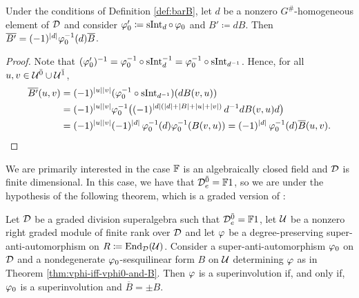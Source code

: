 \begin{lemma}\label{lemma:bar-dB}
    Under the conditions of Definition \ref{def:barB}, let $d$ be a nonzero $G^\#$-homogeneous element of $\mathcal{D}$ and consider $\varphi_0' \coloneqq \operatorname{sInt}_d\circ\, \varphi_0$ and $B' \coloneqq d B$. 
    Then $\overline {B'} = (-1)^{|d|} \varphi_0^{-1} (d) \overline B$.
\end{lemma}

\begin{proof}
    Note that $(\varphi_0')^{-1} = \varphi_0^{-1} \circ \operatorname{sInt}_{d}^{-1} = \varphi_0^{-1} \circ \operatorname{sInt}_{d^{-1}}$. 
    Hence, for all $u, v \in \mathcal U^{\bar0} \cup \mathcal U^{\bar1}$,
    \begin{align*}
        \overline {B'} (u,v) &= (-1)^{|u||v|} (\varphi_0^{-1} \circ \operatorname{sInt}_{d^{-1}})  (d B(v, u) ) \\
        &= (-1)^{|u||v|} \varphi_0^{-1} \big( (-1)^{|d| (|d| + |B| + |u| + |v|)}\,  d^{-1} d B (v, u) d \big) \\ &= (-1)^{|u||v|} (-1)^{|d|}\, \varphi_0^{-1} (d) \varphi_0^{-1}(B(v, u)) =  (-1)^{|d|}\,\varphi_0^{-1} (d) \overline {B} (u, v).
    \end{align*}
\end{proof}

We are primarily interested in the case $\mathbb{F}$ is an algebraically closed field and $\mathcal{D}$ is finite dimensional. 
In this case, we have that $\mathcal{D}^{\bar0}_e = \mathbb{F} 1$, so we are under the hypothesis of the following theorem, which is a graded version of \cite[Theorem 7]{racine}:

\begin{thm}\label{thm:vphi-involution-iff-delta-pm-1}
    Let $\mathcal{D}$ be a graded division superalgebra such that $\mathcal{D}^{\bar0}_e = \mathbb{F} 1$, let $\mathcal U$ be a nonzero right graded module of finite rank over $\mathcal{D}$ and let $\varphi$ be a degree-preserving super-anti-automorphism on $R \coloneqq \operatorname{End}_{\mathcal{D}} (\mathcal U)$. 
    Consider a super-anti-automorphism $\varphi_0$ on $\mathcal{D}$ and a nondegenerate $\varphi_0$-sesqui\-li\-near form $B$ on $\mathcal U$ determining $\varphi$ as in Theorem \ref{thm:vphi-iff-vphi0-and-B}.
    Then $\varphi$ is a superinvolution if, and only if, $\varphi_0$ is a superinvolution and $\overline B = \pm B$. 
\end{thm}

